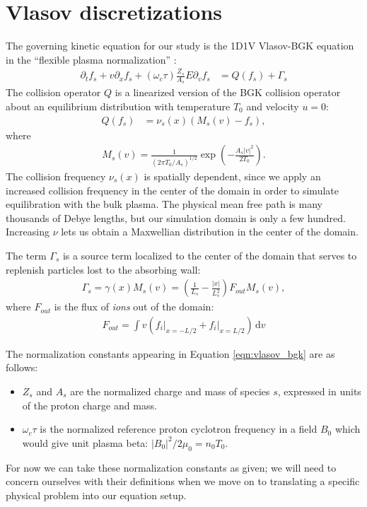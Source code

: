 \documentclass{article}
\begin{document}
\section{Vlasov discretizations}

The governing kinetic equation for our study is the 1D1V Vlasov-BGK equation in
the ``flexible plasma normalization'' \cite{millerMultispecies13momentModel2016}:
\begin{align}
    \label{eqn:vlasov_bgk}
    \partial_t f_s + v \partial_x f_s + (\omega_c \tau) \frac{Z_s}{A_s} E \partial_v f_s &= Q(f_s) + \Gamma_s
\end{align}
The collision operator $Q$ is a linearized version of the BGK collision operator about an equilibrium
distribution with temperature $T_{0}$ and velocity $u = 0$:
\begin{align*}
    Q(f_s) &= \nu_s(x) (M_s(v) - f_s),
\end{align*}
where
\begin{align*}
    M_s(v) = \frac{1}{(2\pi T_0/A_s)^{1/2}} \exp \left( -\frac{A_s|v|^2}{2T_0} \right).
\end{align*}
The collision frequency $\nu_s(x)$ is spatially dependent, since we apply an increased collision frequency in the center of the domain
in order to simulate equilibration with the bulk plasma.
The physical mean free path is many thousands of Debye lengths, but our simulation domain is only a few hundred.
Increasing $\nu$ lets us obtain a Maxwellian distribution in the center of the domain.

The term $\Gamma_s$ is a source term localized to the center of the domain that serves to replenish particles lost to
the absorbing wall:
\begin{align*}
    \Gamma_s = \gamma(x) M_s(v) = \left( \frac{1}{L_s} - \frac{|x|}{L_s^2} \right) F_{out} M_s(v),
\end{align*}
where $F_{out}$ is the flux of \emph{ions} out of the domain:
\begin{align*}
    F_{out} = \int v \left( f_i \vert_{x=-L/2} + f_i \vert_{x=L/2} \right) \, \mathrm{d} v
\end{align*}

The normalization constants appearing in Equation \eqref{eqn:vlasov_bgk} are as follows:
\begin{itemize}
    \item $Z_s$ and $A_s$ are the normalized charge and mass of species $s$, expressed in units of the proton charge and mass.
    \item $\omega_c \tau$ is the normalized reference proton cyclotron frequency in a field $B_0$ which would give unit plasma beta: $|B_0|^2 / 2 \mu_0 = n_0 T_0$.
\end{itemize}
For now we can take these normalization constants as given; we will need to concern ourselves with their definitions when we
move on to translating a specific physical problem into our equation setup.
\end{document}
